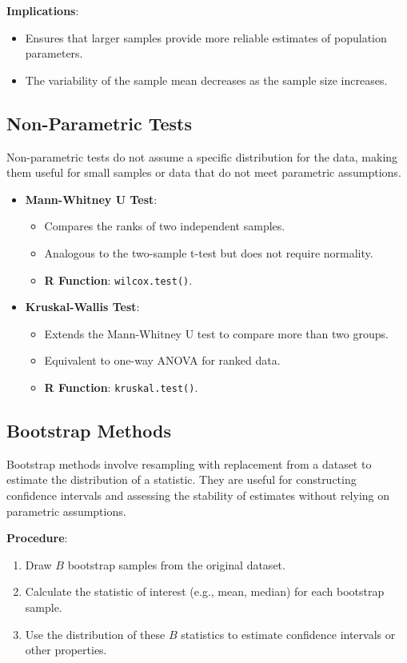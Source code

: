 \textbf{Implications}:
\begin{itemize}
    \item Ensures that larger samples provide more reliable estimates of population parameters.
    \item The variability of the sample mean decreases as the sample size increases.
\end{itemize}

\subsection{Non-Parametric Tests}
Non-parametric tests do not assume a specific distribution for the data, making them useful for small samples or data that do not meet parametric assumptions.

\begin{itemize}
    \item \textbf{Mann-Whitney U Test}:
    \begin{itemize}
        \item Compares the ranks of two independent samples.
        \item Analogous to the two-sample t-test but does not require normality.
        \item \textbf{R Function}: \texttt{wilcox.test()}.
    \end{itemize}
    \item \textbf{Kruskal-Wallis Test}:
    \begin{itemize}
        \item Extends the Mann-Whitney U test to compare more than two groups.
        \item Equivalent to one-way ANOVA for ranked data.
        \item \textbf{R Function}: \texttt{kruskal.test()}.
    \end{itemize}
\end{itemize}

\subsection{Bootstrap Methods}
Bootstrap methods involve resampling with replacement from a dataset to estimate the distribution of a statistic. They are useful for constructing confidence intervals and assessing the stability of estimates without relying on parametric assumptions.

\textbf{Procedure}:
\begin{enumerate}
    \item Draw \(B\) bootstrap samples from the original dataset.
    \item Calculate the statistic of interest (e.g., mean, median) for each bootstrap sample.
    \item Use the distribution of these \(B\) statistics to estimate confidence intervals or other properties.
\end{enumerate}

